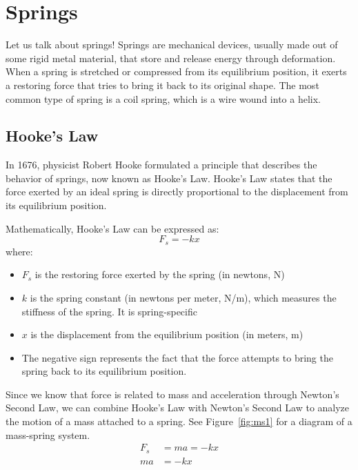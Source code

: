 \section{Springs}
Let us talk about springs! Springs are mechanical devices, usually made out of some
rigid metal material, that store and release energy through deformation. When a spring
is stretched or compressed from its equilibrium position, it exerts a restoring
force that tries to bring it back to its original shape. The most common type of spring
is a coil spring, which is a wire wound into a helix. 

\subsection{Hooke's Law}
In 1676, physicist Robert Hooke formulated a principle that describes the behavior
of springs, now known as Hooke's Law. Hooke's Law states that the force exerted by
an ideal spring is directly proportional to the displacement from its equilibrium
position.

Mathematically, Hooke's Law can be expressed as:
\[
	F_{s}= -kx
\]
where:
\begin{itemize}
	\item $F_{s}$ is the restoring force exerted by the spring (in newtons, N)

	\item $k$ is the spring constant (in newtons per meter, N/m), which measures the
		stiffness of the spring. It is spring-specific

	\item $x$ is the displacement from the equilibrium position (in meters, m)

	\item The negative sign represents the fact that the force attempts to bring the
		spring back to its equilibrium position.
\end{itemize}

Since we know that force is related to mass and acceleration through Newton's
Second Law, we can combine Hooke's Law with Newton's Second Law to analyze the motion
of a mass attached to a spring. See Figure~\ref{fig:ms1} for a diagram of a mass-spring
system.
\begin{align}
	F_{s} & = ma = -kx \\
	ma    & = -kx
\end{align}

